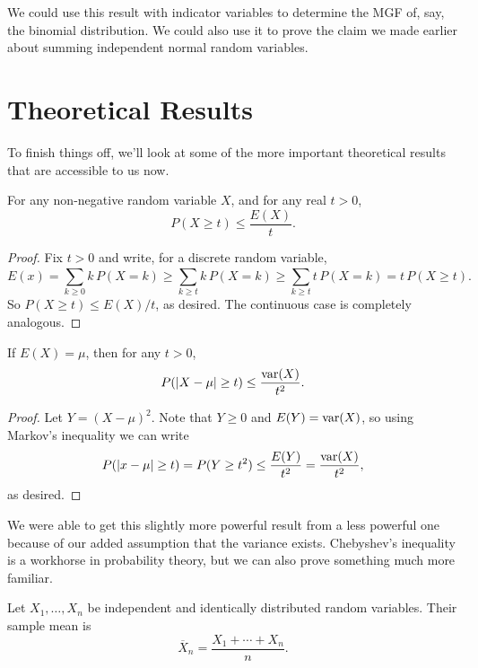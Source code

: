 \documentclass[../m157main.tex]{subfiles}
\begin{document}
We could use this result with indicator variables to determine the MGF of, say, the binomial distribution.
We could also use it to prove the claim we made earlier about summing independent normal random variables.

\section{Theoretical Results}
To finish things off, we'll look at some of the more important theoretical results that are accessible to us now.

\begin{theorem}
    For any non-negative random variable $X$, and for any real $t > 0$,
    \[ P(X \geq t) \leq \frac{E(X)}{t}. \]
\end{theorem}

\begin{proof}
    Fix $t > 0$ and write, for a discrete random variable,
    \[ E(x) = \sum_{k \geq 0}^{} k \,P(X = k) \geq \sum_{k \geq t}^{} k \, P(X = k) \geq \sum_{k \geq t}^{} t \, P(X = k) = t \,P(X \geq t). \]
    So $P(X \geq t) \leq E(X) / t$, as desired.
    The continuous case is completely analogous.
\end{proof}

\begin{theorem}
    If $E(X) = \mu$, then for any $t > 0$,
    \[ P(|X - \mu| \geq t) \leq \frac{\textrm{var}(X)}{t^2}. \]
\end{theorem}

\begin{proof}
    Let $Y = (X-\mu)^2$.
    Note that $Y \geq 0$ and $E(Y) = \textrm{var}(X)$, so using Markov's inequality we can write
    \[ P(|x - \mu| \geq t) = P(Y \geq t^2) \leq \frac{E(Y)}{t^2} = \frac{\textrm{var}(X)}{t^2}, \]
    as desired.
\end{proof}

We were able to get this slightly more powerful result from a less powerful one because of our added assumption that the variance exists.
Chebyshev's inequality is a workhorse in probability theory, but we can also prove something much more familiar.

\begin{definition}
    Let $X_1, \ldots, X_n$ be independent and identically distributed random variables.
    Their sample mean is
    \[ \overline{X}_n = \frac{X_1 + \cdots + X_n}{n}. \]
\end{definition}
\end{document}
